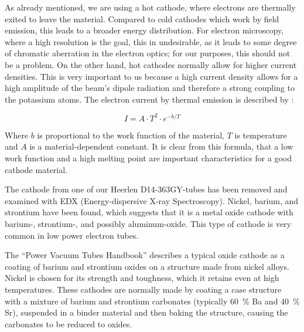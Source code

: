As already mentioned, we are using a hot cathode, where electrons are thermally exited  to leave the material. Compared to cold cathodes which work by field emission, this leads to a broader energy distribution. For electron microscopy, where a high resolution is the goal, this in undesirable, as it leads to some degree of chromatic aberration in the electron optics; for our purposes, this should not be a problem. On the other hand, hot cathodes normally allow for higher current densities. This is very important to us because a high current density allows for a high amplitude of the beam's dipole radiation and therefore a strong coupling to the potassium atoms. The  electron current by thermal emission is described by \cite[chp 3.2.3]{Whitaker}:

\begin{equation}\label{eq:thermionic_current}
I=A\cdot T^2 \cdot e^{-b/T}
\end{equation}

Where $b$ is proportional to the work function of the material, $T$ is temperature and $A$ is a material-dependent constant. It is clear from this formula, that a low work function and a high melting point are important characteristics for a good cathode material. 

The cathode from one of our Heerlen D14-363GY-tubes has been removed and examined with EDX (Energy-dispersive X-ray Spectroscopy). Nickel, barium, and strontium have been found, which suggests that it is a metal oxide cathode with barium-, strontium-, and possibly aluminum-oxide. This type of cathode is very common in low power electron tubes.


The ``Power Vacuum Tubes Handbook'' \cite[chp 3.5.2.1]{Whitaker} describes a typical oxide cathode as a coating of barium and strontium oxides on a structure made from nickel alloys. Nickel is chosen for its strength and toughness, which it retains even at high temperatures. These cathodes are normally made by coating a case structure with a mixture of barium and strontium carbonates (typically \SI{60}{\percent} Ba and \SI{40}{\percent} Sr), suspended in a binder material and then baking the structure, causing the carbonates to be reduced to oxides. 




